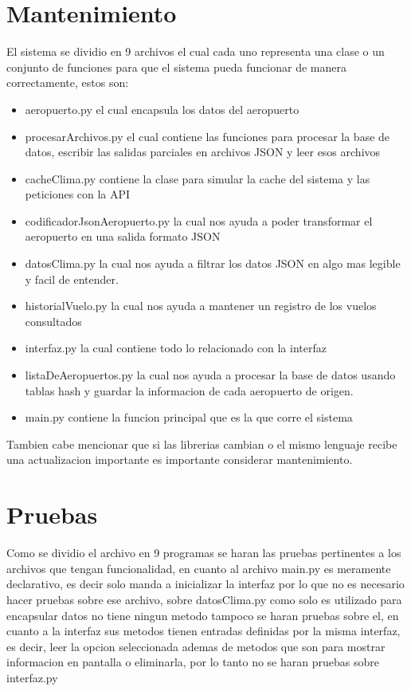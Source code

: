 \documentclass[12pt]{article}
\begin{document}
\section{Mantenimiento}
El sistema se dividio en 9 archivos el cual cada uno representa una clase o un conjunto de funciones para que el sistema pueda funcionar de manera correctamente, estos son:
\begin{itemize}
\item aeropuerto.py el cual encapsula los datos del aeropuerto
\item procesarArchivos.py el cual contiene las funciones para procesar la base de datos, escribir las salidas parciales en archivos JSON y leer esos archivos
\item cacheClima.py contiene la clase para simular la cache del sistema y las peticiones con la API
\item codificadorJsonAeropuerto.py la cual nos ayuda a poder transformar el aeropuerto en una salida formato JSON
\item datosClima.py la cual nos ayuda a filtrar los datos JSON en algo mas legible y facil de entender.
\item historialVuelo.py la cual nos ayuda a mantener un registro de los vuelos consultados
\item interfaz.py la cual contiene todo lo relacionado con la interfaz
\item listaDeAeropuertos.py la cual nos ayuda a procesar la base de datos usando tablas hash y guardar la informacion de cada aeropuerto de origen.
\item main.py contiene la funcion principal que es la que corre el sistema
\end{itemize}

Tambien cabe mencionar que si las librerias cambian o el mismo lenguaje recibe una actualizacion importante es importante considerar mantenimiento.
\section{Pruebas}
Como se dividio el archivo en 9 programas se haran las pruebas pertinentes a los archivos que tengan funcionalidad, en cuanto al archivo main.py es meramente declarativo, es decir solo manda a inicializar la interfaz por lo que no es necesario hacer pruebas sobre ese archivo, sobre datosClima.py como solo es utilizado para encapsular datos no tiene ningun metodo tampoco se haran pruebas sobre el, en cuanto a la interfaz sus metodos tienen entradas definidas por la misma interfaz, es decir, leer la opcion seleccionada ademas de metodos que son para mostrar informacion en pantalla o eliminarla, por lo tanto no se haran pruebas sobre interfaz.py
\end{document}
